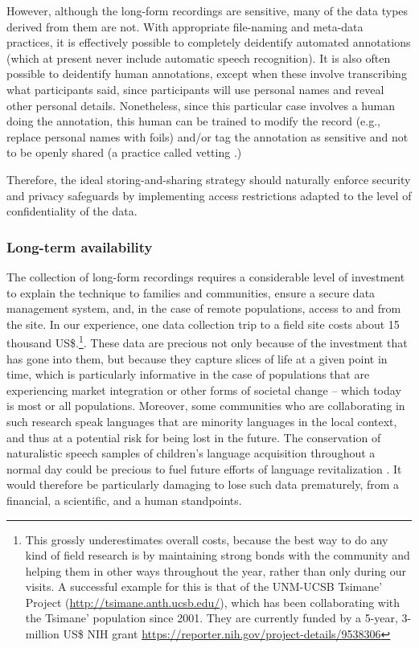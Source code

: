 \documentclass[smallextended]{svjour3}       %
\begin{document}
However, although the long-form recordings are sensitive, many of the data types derived from them are not. With appropriate file-naming and meta-data practices, it is effectively possible to completely deidentify automated annotations (which at present never include automatic speech recognition). It is also often possible to deidentify human annotations, except when these involve transcribing what participants said, since participants will use personal names and reveal other personal details. Nonetheless, since this particular case involves a human doing the annotation, this human can be trained to modify the record (e.g., replace personal names with foils) and/or tag the annotation as sensitive and not to be openly shared (a practice called vetting \citep{Cychosz2020}.)

Therefore, the ideal storing-and-sharing strategy should naturally enforce security and privacy safeguards by implementing access restrictions adapted to the level of confidentiality of the data.

\subsubsection*{Long-term availability}

The collection of long-form recordings requires a considerable level of investment to explain the technique to families and communities, ensure a secure data management system, and, in the case of remote populations, access to and from the site. In our experience, one data collection trip to a field site costs about 15 thousand US\$.\footnote{This grossly underestimates overall costs, because the best way to do any kind of field research is by maintaining strong bonds with the community and helping them in other ways throughout the year, rather than only during our visits. A successful example for this is that of the UNM-UCSB Tsimane' Project (\url{http://tsimane.anth.ucsb.edu/}), which has been collaborating with the Tsimane' population since 2001. They are currently funded by a 5-year, 3-million US\$ NIH grant \url{https://reporter.nih.gov/project-details/9538306}}. These data are precious not only because of the investment that has gone into them, but because they capture slices of life at a given point in time, which is particularly informative in the case of populations that are experiencing market integration or other forms of societal change -- which today is most or all populations. Moreover, some communities who are collaborating in such research speak languages that are minority languages in the local context, and thus at a potential risk for being lost in the future. The conservation of naturalistic speech samples of children's language acquisition throughout a normal day could be precious to fuel future efforts of language revitalization \citep{Nee2021}. It would therefore be particularly damaging to lose such data prematurely, from a financial, a scientific, and a human standpoints.
\end{document}
